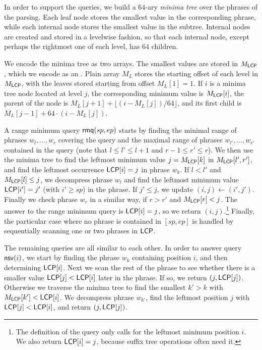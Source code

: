 In order to support the queries, we build a $64$-ary \emph{minima tree} over
the phrases of the \RLZ{} parsing. Each leaf node stores the smallest \LCP{}
value in the corresponding phrase, while each internal node stores the
smallest value in the subtree. Internal nodes are created and stored in a
levelwise fashion, so that each internal node, except perhaps the rightmost
one of each level, has $64$ children.

We encode the minima tree as two arrays. The smallest \LCP{} values are
stored in $M_{\mathsf{LCP}}$, which we encode as an \slarray. Plain array $M_{L}$
stores the starting offset of each level in $M_{\mathsf{LCP}}$, with the leaves
stored starting from offset $M_{L}[1] = 1$. If $i$ is a minima tree node
located at level $j$, the corresponding minimum value is $M_{\mathsf{LCP}}[i]$, the
parent of the node is $M_{L}[j+1] + \lfloor (i - M_{L}[j]) / 64 \rfloor$,
and its first child is $M_{L}[j-1] + 64 \cdot (i - M_{L}[j])$.

A range minimum query $\mathsf{rmq}(sp,ep)$ starts by finding the minimal range of
phrases $w_{l}, \dotsc, w_{r}$ covering the query and the maximal range of
phrases $w_{l'}, \dotsc, w_{r'}$ contained in the query (note that $l \le l' \le
l+1$ and $r-1 \le r' \le r$). We then use the
minima tree to find the leftmost minimum value $j = M_{\mathsf{LCP}}[k]$ in
$M_{\mathsf{LCP}}[l',r']$, and find the leftmost occurrence $\mathsf{LCP}[i] = j$ in phrase
$w_{k}$. If $l < l'$ and $M_{\mathsf{LCP}}[l] \le j$, we decompress phrase $w_{l}$
and find the leftmost minimum value $\mathsf{LCP}[i'] = j'$ (with $i' \ge sp$) in the
phrase. If $j' \le j$, we update $(i,j) \leftarrow (i',j')$. Finally we check
phrase $w_{r}$ in a similar way, if $r > r'$ and $M_{\mathsf{LCP}}[r] < j$. The answer
to the range minimum query is $\mathsf{LCP}[i] = j$, so we return
$(i,j)$.\footnote{The definition of the query only calls for the leftmost
minimum position $i$. We also return $\mathsf{LCP}[i] = j$, because suffix tree
operations often need it.} Finally, the particular case where no phrase is
contained in $[sp,ep]$ is handled by sequentially scanning one or two phrases
in $\textsf{LCP}$.

The remaining queries are all similar to each other. In order to answer query
$\mathsf{nsv}(i)$, we start by finding the phrase $w_{k}$ containing position $i$,
and then determining $\mathsf{LCP}[i]$. Next we scan the rest of the phrase to see
whether there is a smaller value $\mathsf{LCP}[j] < \mathsf{LCP}[i]$ later in the phrase. If
so, we return $(j,\mathsf{LCP}[j])$. Otherwise we traverse the minima tree to find
the smallest $k' > k$ with $M_{\mathsf{LCP}}[k'] < \mathsf{LCP}[i]$. We decompress
phrase $w_{k'}$, find the leftmost position $j$ with $\mathsf{LCP}[j] < \mathsf{LCP}[i]$,
and return $(j,\mathsf{LCP}[j])$.

